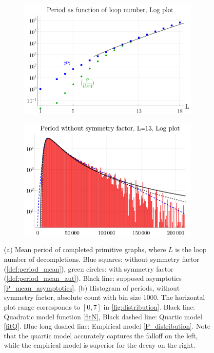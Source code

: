 \documentclass[12pt,a4paper]{article}
\renewcommand{\|}{\rule[-0.4ex]{0.2ex}{1.2em}}
\begin{document}
\begin{figure}[h!]
	\centering
	\begin{subfigure}[b]{.49 \textwidth}
		\includegraphics[width=\linewidth]{period_mean}
		\subcaption{}
		\label{fig:period_mean}
	\end{subfigure}
	\begin{subfigure}[b]{.49 \textwidth}
		\includegraphics[width=\linewidth]{fit_comparison}
		\subcaption{}
		\label{fig:fit_comparison}
	\end{subfigure}
	
	\caption{(a) Mean period of completed primitive graphs, where $L$ is the loop number of decompletions. Blue squares: without symmetry factor (\cref{def:period_mean}), green circles: with symmetry factor (\cref{def:period_mean_aut}). Black line: supposed asymptotics \cref{P_mean_asymptotics}.
		(b) Histogram of periods, without symmetry factor, absolute count with bin size 1000. The horizontal plot range corresponds to $[0,7]$ in \cref{fig:distribution}. Black line: Quadratic model function \cref{fitN}, Black dashed line: Quartic model \cref{fitQ}. Blue long dashed line: Empirical model \cref{P_distribution}.  Note that the quartic model accurately captures the falloff on the left, while the empirical model is superior for the decay on the right.
	}
\end{figure}
\end{document}
